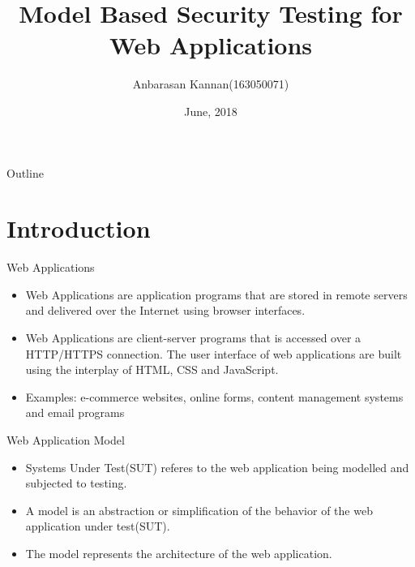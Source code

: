 \documentclass{beamer}
\title{Model Based Security Testing for Web Applications}
\author{Anbarasan Kannan(163050071)\inst{1} }
\institute[IIT BOMBAY] %
{
  \inst{1}%
  Department of Computer Science\\
  IIT Bombay}
\date{June, 2018}
\begin{document}
\begin{frame}
  \titlepage
\end{frame}

\begin{frame}{Outline}
  \tableofcontents
\end{frame}

\section{Introduction}


\begin{frame}{Web Applications}

  \begin{itemize}
  \item Web Applications are application programs that are stored in remote servers and delivered over the Internet using browser interfaces.
  \item Web Applications are client-server programs that is accessed over a HTTP/HTTPS connection. The user interface of web applications are built using the interplay of HTML, CSS and JavaScript.
  \item Examples: e-commerce websites, online forms, content management systems and email programs
\end{itemize}
\end{frame}

\begin{frame}{Web Application Model}

  \begin{itemize}
  \item Systems Under Test(SUT) referes to the web application being modelled and subjected to testing.
  \item A model is an abstraction or simplification of the behavior of the web application under test(SUT).
  \item The model represents the architecture of the web application.
\end{itemize}
\end{frame}
\end{document}
